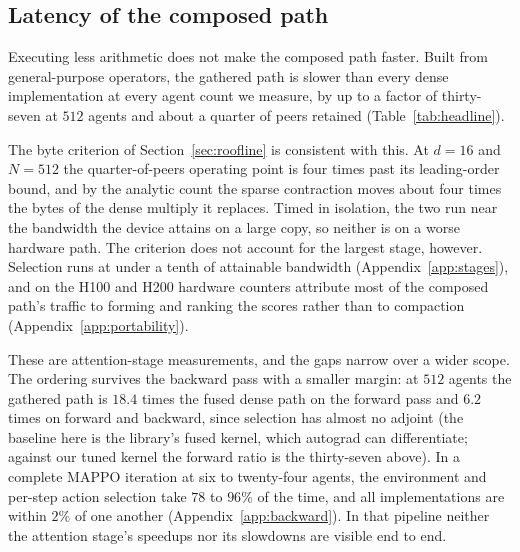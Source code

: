 \subsection{Latency of the composed path}
\label{sec:latency}

\begin{table}[t]
\centering\small
\caption{Forward latency (ms, minimum over interleaved samples) of one function
computed six ways, at about a quarter of peers retained. The composed sparse path is
slower than every dense implementation at every agent count, and the gap widens
with $N$; the fused kernels are faster only at small $k$
(Section~\ref{sec:fused}). Rows below $N{=}192$ are dominated by per-kernel
cost and are read in Section~\ref{sec:smalln}.}
\label{tab:headline}

\end{table}

Executing less arithmetic does not make the composed path faster. Built from
general-purpose operators, the gathered path is slower than every dense
implementation at every agent count we measure, by up to a factor of
thirty-seven at $512$ agents and about a quarter of peers retained
(Table~\ref{tab:headline}).

The byte criterion of Section~\ref{sec:roofline} is consistent with this. At
$d{=}16$ and $N{=}512$ the quarter-of-peers operating point is four times past
its leading-order bound, and by the analytic count the sparse contraction moves
about four times the bytes of the dense multiply it replaces. Timed in
isolation, the two run near the bandwidth the device attains on a large copy, so
neither is on a worse hardware path. The criterion does not account for the
largest stage, however. Selection runs at under a tenth of attainable bandwidth
(Appendix~\ref{app:stages}), and on the H100 and H200 hardware counters
attribute most of the composed path's traffic to forming and ranking the scores
rather than to compaction (Appendix~\ref{app:portability}).

These are attention-stage measurements, and the gaps narrow over a wider scope.
The ordering survives the backward pass with a smaller margin: at $512$ agents
the gathered path is $18.4$ times the fused dense path on the forward pass and
$6.2$ times on forward and backward, since selection has almost no adjoint (the
baseline here is the library's fused kernel, which autograd can differentiate;
against our tuned kernel the forward ratio is the thirty-seven above). In a
complete MAPPO \citep{yu2022mappo} iteration at six to twenty-four agents, the environment and
per-step action selection take $78$ to $96\%$ of the time, and all
implementations are within $2\%$ of one another (Appendix~\ref{app:backward}).
In that pipeline neither the attention stage's speedups nor its slowdowns are
visible end to end.

